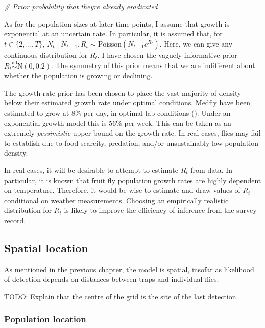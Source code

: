 \documentclass[
]{book}
\newenvironment{Shaded}{\begin{snugshade}}{\end{snugshade}}
\newcommand{\CommentTok}[1]{\textcolor[rgb]{0.56,0.35,0.01}{\textit{#1}}}
\begin{document}
\begin{Shaded}
\begin{Highlighting}[]
\CommentTok{\# Prior probability that they\textquotesingle{}re already eradicated}
\end{Highlighting}
\end{Shaded}

As for the population sizes at later time points, I assume that growth is exponential at an uncertain rate. In particular, it is assumed that, for \(t \in \{2, \ldots, T\}\), \(N_t \mid N_{t-1}, R_t \sim \mathrm{Poisson}(N_{t-1} e^{R_t})\). Here, we can give any continuous distribution for \(R_t\). I have chosen the vaguely informative prior \(R_t \stackrel{\text{iid}} \sim \mathrm N(0, 0.2)\). The symmetry of this prior means that we are indifferent about whether the population is growing or declining.

The growth rate prior has been chosen to place the vast majority of density below their estimated growth rate under optimal conditions. Medfly have been estimated to grow at 8\% per day, in optimal lab conditions (\citet{papadopoulos2002}). Under an exponential growth model this is 56\% per week. This can be taken as an extremely \emph{pessimistic} upper bound on the growth rate. In real cases, flies may fail to establish due to food scarcity, predation, and/or unsustainably low population density.

In real cases, it will be desirable to attempt to estimate \(R_t\) from data. In particular, it is known that fruit fly population growth rates are highly dependent on temperature. Therefore, it would be wise to estimate and draw values of \(R_t\) conditional on weather measurements. Choosing an empirically realistic distribution for \(R_t\) is likely to improve the efficiency of inference from the survey record.

\hypertarget{spatial-location}{%
\subsection{Spatial location}\label{spatial-location}}

As mentioned in the previous chapter, the model is spatial, insofar as likelihood of detection depends on distances between traps and individual flies.

TODO: Explain that the centre of the grid is the site of the last detection.

\hypertarget{population-location-1}{%
\subsubsection{Population location}\label{population-location-1}}
\end{document}
